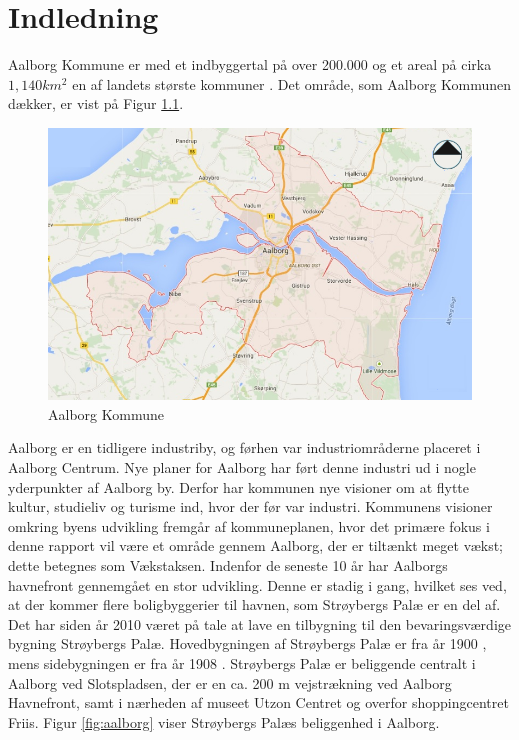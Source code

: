 \chapter{Indledning}
Aalborg Kommune er med et indbyggertal på over 200.000 og et areal på cirka  $1,\!140 km^2$ en af landets største kommuner \citep{kommunedata}. Det område, som Aalborg Kommunen dækker, er vist på Figur \ref{fig:aalborgkommune}. 

\begin{figure}[htbp]
	\includegraphics[width=1.0\textwidth]{billeder/aalborgkommune.png}
	\caption{Aalborg Kommune}
	\label{fig:aalborgkommune}
\end{figure}

Aalborg er en tidligere industriby, og førhen var industriområderne placeret i Aalborg Centrum. Nye planer for Aalborg har ført denne industri ud i nogle yderpunkter af Aalborg by. Derfor har kommunen nye visioner om at flytte kultur, studieliv og turisme ind, hvor der før var industri. Kommunens visioner omkring byens udvikling fremgår af kommuneplanen, hvor det primære fokus i denne rapport vil være et område gennem Aalborg, der er tiltænkt meget vækst; dette betegnes som Vækstaksen.
\newline \indent{     }  Indenfor de seneste 10 år har Aalborgs havnefront gennemgået en stor udvikling. Denne er stadig i gang, hvilket ses ved, at der kommer flere boligbyggerier til havnen, som Strøybergs Palæ er en del af. 
\newline \indent{     }  Det har siden år 2010 været på tale at lave en tilbygning til den bevaringsværdige bygning Strøybergs Palæ. Hovedbygningen af Strøybergs Palæ er fra år 1900 \citep{hovedbygning}, mens sidebygningen er fra år 1908 \citep{sidebygning}. Strøybergs Palæ er beliggende centralt i Aalborg ved Slotspladsen, der er en ca. 200 m vejstrækning ved Aalborg Havnefront, samt i nærheden af museet Utzon Centret og overfor shoppingcentret Friis. Figur \ref{fig:aalborg} viser Strøybergs Palæs beliggenhed i Aalborg.

